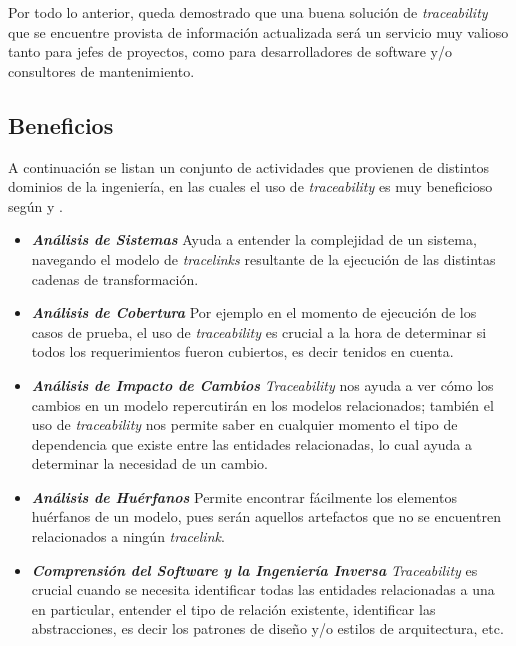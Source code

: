 \documentclass[a4paper,12pt,oneside,spanish]{book}
\begin{document}
Por todo lo anterior, queda demostrado que una buena solución de \textit{traceability} que se encuentre provista de información actualizada será un servicio muy valioso tanto para jefes de proyectos, como para desarrolladores de software y/o consultores de mantenimiento.




\subsection{Beneficios}

A continuación se listan un conjunto de actividades que provienen de distintos dominios de la ingeniería, en las cuales el uso de \textit{traceability} es muy beneficioso según \cite{BrcinaRiebisch} y \cite{GrammelVoigt}.

\begin{itemize}

\item \textit{\textbf{Análisis de Sistemas}} Ayuda a entender la complejidad de un sistema, navegando el modelo de \textit{tracelinks} resultante de la ejecución de las distintas cadenas de transformación.

\item \textit{\textbf{Análisis de Cobertura}} Por ejemplo en el momento de ejecución de los casos de prueba, el uso de \textit{traceability} es crucial a la hora de determinar si todos los requerimientos fueron cubiertos, es decir tenidos en cuenta.

\item \textit{\textbf{Análisis de Impacto de Cambios}} \textit{Traceability} nos ayuda a ver cómo los cambios en un modelo repercutirán en los modelos relacionados; también el uso de \textit{traceability} nos permite saber en cualquier momento el tipo de dependencia que existe entre las entidades relacionadas, lo cual ayuda a determinar la necesidad de un cambio.

\item \textit{\textbf{Análisis de Huérfanos}} Permite encontrar fácilmente los elementos huérfanos de un modelo, pues serán aquellos artefactos que no se encuentren relacionados a ningún \textit{tracelink}.

\item \textit{\textbf{Comprensión del Software y la Ingeniería Inversa}} \textit{Traceability} es crucial cuando se necesita identificar todas las entidades relacionadas a una en particular, entender el tipo de relación existente, identificar las abstracciones, es decir los patrones de diseño y/o estilos de arquitectura, etc.


\end{itemize}
\end{document}
